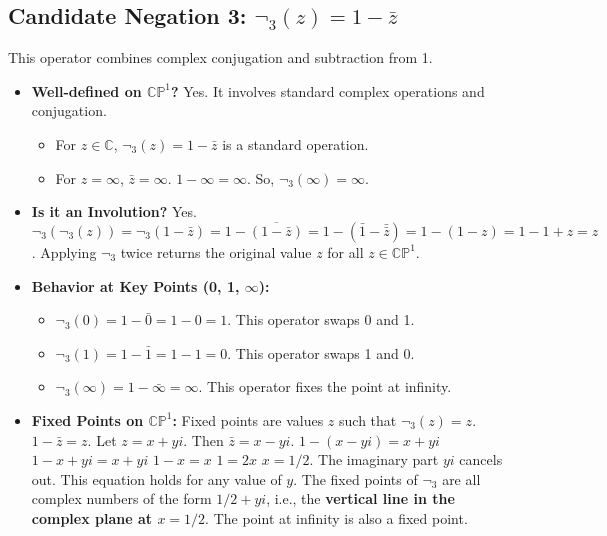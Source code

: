 	\subsection{Candidate Negation 3: $\neg_3(z) = 1 - \bar{z}$}
	
	This operator combines complex conjugation and subtraction from 1.
	
	\begin{itemize}
		\item \textbf{Well-defined on $\mathbb{CP}^1$?} Yes. It involves standard complex operations and conjugation.
		\begin{itemize}
			\item For $z \in \mathbb{C}$, $\neg_3(z) = 1 - \bar{z}$ is a standard operation.
			\item For $z = \infty$, $\bar{z} = \infty$. $1 - \infty = \infty$. So, $\neg_3(\infty) = \infty$.
		\end{itemize}
		
		\item \textbf{Is it an Involution?} Yes.
		$\neg_3(\neg_3(z)) = \neg_3(1 - \bar{z}) = 1 - \overline{(1 - \bar{z})} = 1 - (\bar{1} - \bar{\bar{z}}) = 1 - (1 - z) = 1 - 1 + z = z$.
		Applying $\neg_3$ twice returns the original value $z$ for all $z \in \mathbb{CP}^1$.
		
		\item \textbf{Behavior at Key Points (0, 1, $\infty$):}
		\begin{itemize}
			\item $\neg_3(0) = 1 - \bar{0} = 1 - 0 = 1$. This operator swaps 0 and 1.
			\item $\neg_3(1) = 1 - \bar{1} = 1 - 1 = 0$. This operator swaps 1 and 0.
			\item $\neg_3(\infty) = 1 - \bar{\infty} = \infty$. This operator fixes the point at infinity.
		\end{itemize}
		
		\item \textbf{Fixed Points on $\mathbb{CP}^1$:} Fixed points are values $z$ such that $\neg_3(z) = z$.
		$1 - \bar{z} = z$.
		Let $z = x + yi$. Then $\bar{z} = x - yi$.
		$1 - (x - yi) = x + yi$
		$1 - x + yi = x + yi$
		$1 - x = x$
		$1 = 2x$
		$x = 1/2$.
		The imaginary part $yi$ cancels out. This equation holds for any value of $y$.
		The fixed points of $\neg_3$ are all complex numbers of the form $1/2 + yi$, i.e., the \textbf{vertical line in the complex plane at $x = 1/2$}. The point at infinity is also a fixed point.
		

\end{itemize}
